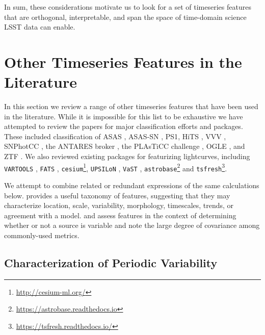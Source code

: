 \documentclass[DM,authoryear,toc]{lsstdoc}
\begin{document}
In sum, these considerations motivate us to look for a set of timeseries features that are orthogonal, interpretable, and span the space of time-domain science LSST data can enable.

\section{Other Timeseries Features in the Literature}

In this section we review a range of other timeseries features that have been used in the literature.
While it is impossible for this list to be exhaustive we have attempted to review the papers for major classification efforts and packages.
These included classification of ASAS \citep{Richards:12:ASASCatalog}, ASAS-SN \citep{Jayasinghe:18:ASASSNVarsI,Jayasinghe:19:ASASSNVarsII,Jayasinghe:19:ASASSNVarsIII,Jayasinghe:19:ASASSNVarsV}, PS1\citep{Hernitschek:16:PS1SF, tmp_Villar:20:SuperRAENN}, HiTS \citep{Martinez:18:THE-HIGH-CADENC}, VVV \citep{Elorrieta:16:A-machine-learn}, SNPhotCC \citep{Kessler:10:SNPhotCC}, the ANTARES broker \citep{Narayan:18:ANTARES}, the PLAsTiCC challenge \citep{2018arXiv180911145M,Kessler:19:PlasticcModels, Boone:19:AvocadoClassifier}, OGLE \citep{Pashchenko:18:OGLEClassification}, and ZTF \citep{Sanchez-Saez:21:AlertClassification, tmp_Coughlin:20:ZTFClassification}. 
We also reviewed existing packages for featurizing lightcurves, including \texttt{VARTOOLS} \citep{Hartman:16:VARTOOLS}, \texttt{FATS} \citep{Nun:15:FATS}, \texttt{cesium}\footnote{\url{http://cesium-ml.org/}}, \texttt{UPSILoN} \citep{Kim:16:UPSILoN}, \texttt{VaST} \citep{Sokolovsky:17:VaST}, \texttt{astrobase}\footnote{\url{https://astrobase.readthedocs.io}} and \texttt{tsfresh}\footnote{\url{https://tsfresh.readthedocs.io/}}.

We attempt to combine related or redundant expressions of the same calculations below.
\citet{Graham:17:VariableClassificationChallenges} provides a useful taxonomy of features, suggesting that they may characterize location, scale, variability, morphology, timescales, trends, or agreement with a model. 
\citet{Sokolovsky:17:VariabilityDetection} and \citet{Pashchenko:18:OGLEClassification} assess features in the context of determining whether or not a source is variable and note the large degree of covariance among commonly-used metrics.




\subsection{Characterization of Periodic Variability}
\end{document}
